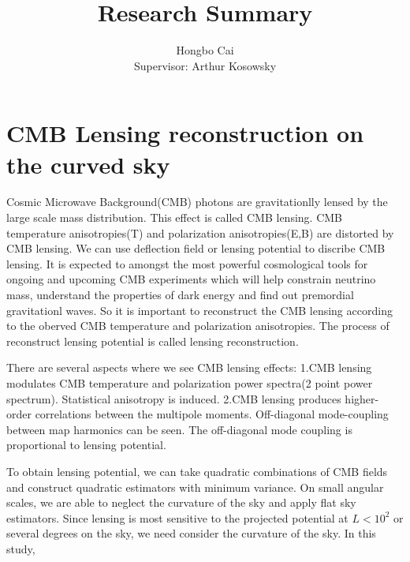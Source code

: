 \documentclass[12pt, notitlepage, onecolumn, amsmath, amssymb, aps]{revtex4-1}
\title{}
\begin{document}
\title{Research Summary}
\author{Hongbo Cai \\{\small Supervisor: Arthur Kosowsky}}
\maketitle
\newcommand{\edit}[1]{\textcolor{red}{(#1)}}
\vspace{-1.5cm}
\section{CMB Lensing reconstruction on the curved sky}
\label{sec:org8852578}


Cosmic Microwave Background(CMB) photons are gravitationlly lensed by the large scale mass distribution. This effect is called CMB lensing. CMB temperature anisotropies(T) and polarization anisotropies(E,B) are distorted by CMB lensing. We can use deflection field or lensing potential to discribe CMB lensing\cite{Lewis:2006fu}. It is expected to amongst the most powerful cosmological tools for ongoing and upcoming CMB experiments which will help constrain neutrino mass, understand the properties of dark energy and find out premordial gravitationl waves. So it is important to reconstruct the CMB lensing according to the oberved CMB temperature and polarization anisotropies. 
The process of reconstruct lensing potential is called lensing reconstruction.

There are several aspects where we see CMB lensing effects:
1.CMB lensing modulates CMB temperature and polarization power spectra(2 point power spectrum). Statistical anisotropy is induced.
2.CMB lensing produces higher-order correlations between the multipole moments. Off-diagonal mode-coupling between map harmonics can be seen. The off-diagonal mode coupling is proportional to lensing potential.\cite{Hu:2001kj}

To obtain lensing potential, we can take quadratic combinations of CMB fields and construct quadratic estimators with minimum variance\cite{Hu:2000ee}. On small angular scales, we are able to neglect the curvature of the sky and apply flat sky estimators\cite{Hu:2001kj}. Since lensing is most sensitive to the projected potential at \(L<10^2\) or several degrees on the sky, we need consider the curvature of the sky. In this study, 
\end{document}
